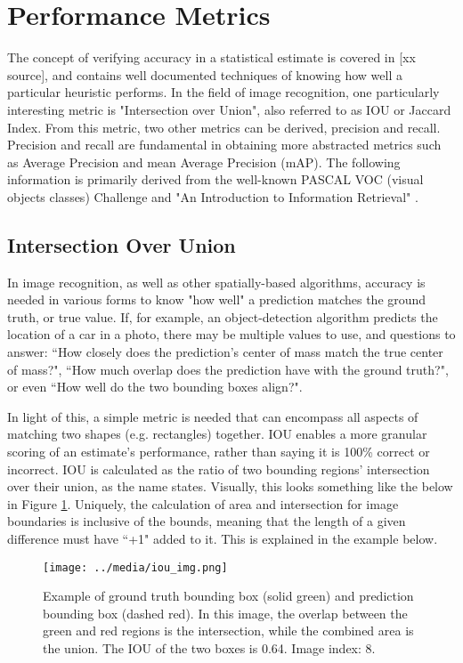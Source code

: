 
\section{Performance Metrics}
The concept of verifying accuracy in a statistical estimate is covered in [xx source], and contains well documented techniques of knowing how well a particular heuristic performs. In the field of image recognition, one particularly interesting metric is "Intersection over Union", also referred to as IOU or Jaccard Index. From this metric, two other metrics can be derived, precision and recall. Precision and recall are fundamental in obtaining more abstracted metrics such as Average Precision and mean Average Precision (mAP). The following information is primarily derived from the well-known PASCAL VOC (visual objects classes) Challenge \cite{everingham_pascal_2010} and "An Introduction to Information Retrieval" \cite{Manning:2008:IIR:1394399}.

\subsection{Intersection Over Union}
In image recognition, as well as other spatially-based algorithms, accuracy is needed in various forms to know "how well" a prediction matches the ground truth, or true value. If, for example, an object-detection algorithm predicts the location of a car in a photo, there may be multiple values to use, and questions to answer: ``How closely does the prediction's center of mass match the true center of mass?", ``How much overlap does the prediction have with the ground truth?", or even ``How well do the two bounding boxes align?". 

In light of this, a simple metric is needed that can encompass all aspects of matching two shapes (e.g. rectangles) together. IOU enables a more granular scoring of an estimate's performance, rather than saying it is 100\% correct or incorrect. IOU is calculated as the ratio of two bounding regions' intersection over their union, as the name states. Visually, this looks something like the below in Figure \ref{iou_img}. Uniquely, the calculation of area and intersection for image boundaries is inclusive of the bounds, meaning that the length of a given difference must have ``+1" added to it. This is explained in the example below.

\begin{figure}[ht] %
    \texttt{[image: ../media/iou\_img.png]}
    \caption{Example of ground truth bounding box (solid green) and prediction bounding box (dashed red). In this image, the overlap between the green and red regions is the intersection, while the combined area is the union. The IOU of the two boxes is 0.64. Image index: 8.}
    \label{iou_img} %
\end{figure}

